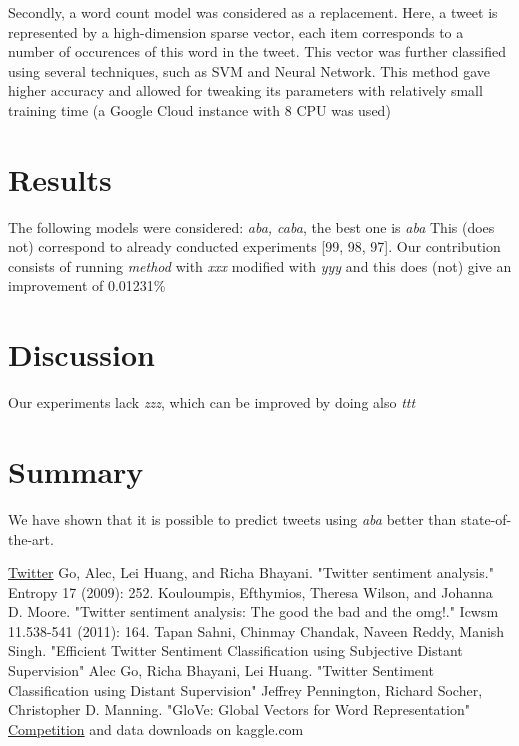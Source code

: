 \documentclass[10pt,conference,compsocconf]{IEEEtran}
\begin{document}
Secondly, a word count model was considered as a replacement. Here, a tweet is represented by a high-dimension sparse vector, each item corresponds to a number of occurences of this word in the tweet. This vector was further classified using several techniques, such as SVM and Neural Network. This method gave higher accuracy and allowed for tweaking its parameters with relatively small training time (a Google Cloud instance with 8 CPU was used)
\section{Results}
The following models were considered: {\em aba, caba}, the best one is {\em aba} This (does not) correspond to already conducted experiments [99, 98, 97]. Our contribution consists of running {\em method} with {\em xxx} modified with {\em yyy} and this does (not) give an improvement of 0.01231\%
\section{Discussion}
Our experiments lack {\em zzz}, which can be improved by doing also {\em ttt}
\section{Summary}
We have shown that it is possible to predict tweets using {\em aba} better than state-of-the-art.

\begin{thebibliography}{99}
	 \href{http://twitter.com}{Twitter}
	 Go, Alec, Lei Huang, and Richa Bhayani. "Twitter sentiment analysis." Entropy 17 (2009): 252.
	 Kouloumpis, Efthymios, Theresa Wilson, and Johanna D. Moore. "Twitter sentiment analysis: The good the bad and the omg!." Icwsm 11.538-541 (2011): 164.
	 Tapan Sahni, Chinmay Chandak, Naveen Reddy, Manish Singh. "Efficient Twitter Sentiment Classification using Subjective Distant Supervision"
	 Alec Go, Richa Bhayani,	Lei Huang. "Twitter Sentiment Classification using Distant Supervision"
	 Jeffrey Pennington, Richard Socher, Christopher D. Manning. "GloVe: Global Vectors for Word Representation"
	 \href{https://www.kaggle.com/c/epfml17-text/data}{Competition} and data downloads on kaggle.com
\end{thebibliography}
\end{document}
